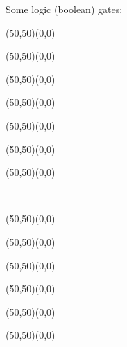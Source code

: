	Some logic (boolean) gates:
	\vspace{1cm}
	\begin{center}
	\begin{picture}(50,50)(0,0)
	\end{picture}
	\begin{picture}(50,50)(0,0)
	\end{picture}
	\begin{picture}(50,50)(0,0)
	\end{picture}
	\begin{picture}(50,50)(0,0)
	\end{picture}
	\begin{picture}(50,50)(0,0)
	\end{picture}
	\begin{picture}(50,50)(0,0)
	\end{picture}
	\begin{picture}(50,50)(0,0)
	\end{picture}\\[2cm]
	\end{center}
	
	
	\vspace{1cm}
	\begin{center}
	\begin{picture}(50,50)(0,0)
	\end{picture}
	\begin{picture}(50,50)(0,0)
	\end{picture}
	\begin{picture}(50,50)(0,0)
	\end{picture}
	\begin{picture}(50,50)(0,0)
	\end{picture}
	\begin{picture}(50,50)(0,0)
	\end{picture}
	\begin{picture}(50,50)(0,0)
	\end{picture}\\[2cm]
	\end{center}

